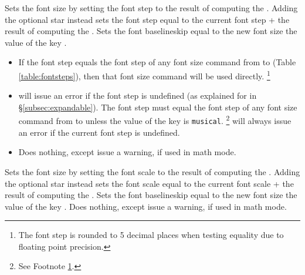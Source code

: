\documentclass{beery}
\begin{document}
\begin{mydisplaycode}
   \sarg{} 
\end{mydisplaycode}

Sets the font size by setting the font step to the result of computing the .
Adding the optional star \sarg{} instead sets the font step equal to the current font step + the result of computing the .
Sets the font baselineskip equal to the new font size \texttimes{} the value of the key .

\begin{itemize}
  \item
  If the font step equals the font step of any font size command from  to  (Table \ref{table:fontsteps}), then that font size command will be used directly.%
  \footnote
    {%
      \label{fn:setfontstep}%
      The font step is rounded to \num{5} decimal places when testing equality due to floating point precision.%
    }
  \item
   will issue an error if the font step is undefined (as explained for  in \S\ref{subsec:expandable}).
  The font step must equal the font step of any font size command from  to  unless the value of the key  is \texttt{musical}.%
  \footnote{See Footnote \ref{fn:setfontstep}.}
   will always issue an error if the current font step is undefined.
  \item
  Does nothing, except issue a warning, if used in math mode.
\end{itemize}

\begin{mydisplaycode}
   \sarg{} 
\end{mydisplaycode}

Sets the font size by setting the font scale to the result of computing the .
Adding the optional star \sarg{} instead sets the font scale equal to the current font scale + the result of computing the .
Sets the font baselineskip equal to the new font size \texttimes{} the value of the key .
Does nothing, except issue a warning, if used in math mode.

\begin{mydisplaycode}
   \sarg{} 
\end{mydisplaycode}
\end{document}
